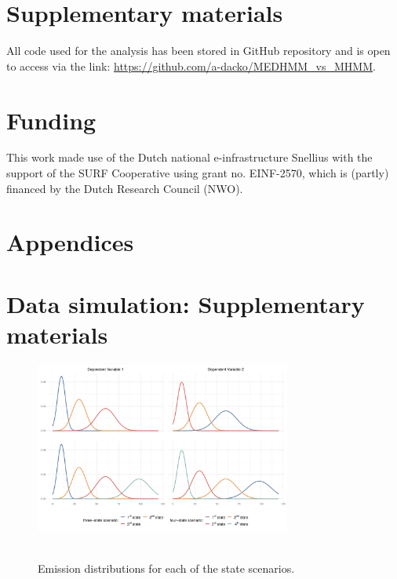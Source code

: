 \documentclass[]{interact}
\begin{document}
\section*{Supplementary materials}
All code used for the analysis has been stored in GitHub repository and is open to access via the link: \url{https://github.com/a-dacko/MEDHMM\_vs\_MHMM}.
\section*{Funding}
This work made use of the Dutch national e-infrastructure Snellius with the support of the
SURF Cooperative using grant no. EINF-2570, which is (partly) financed by the Dutch
Research Council (NWO).

\printacronyms[name=Abbreviations]




\section{Appendices}
\appendix
\section{Data simulation: Supplementary materials}
\begin{figure}[h]
\caption{\\Emission distributions for each of the state scenarios.} \centering
\includegraphics[width=0.75\textwidth]{graphics/emiss_dist_plot.pdf}
\label{em_ds}
\end{figure}
\end{document}
